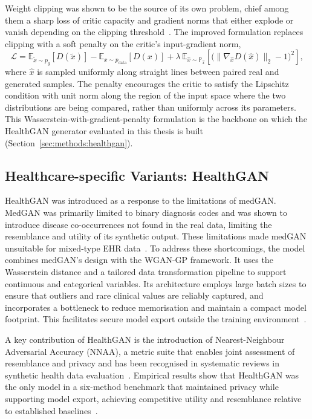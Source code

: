 Weight clipping was shown to be the source of
its own problem, chief among them a sharp loss of critic
capacity and gradient norms that either explode or vanish depending
on the clipping threshold~\cite{Gulrajani2017WGANGP}. The improved
formulation replaces clipping with a soft penalty on the critic's
input-gradient norm,
\begin{equation}
\label{eq:wgan-gp}
\mathcal{L}
= \mathbb{E}_{\tilde{x} \sim p_g}\!\left[D(\tilde{x})\right]
- \mathbb{E}_{x \sim p_{\text{data}}}\!\left[D(x)\right]
+ \lambda \,
\mathbb{E}_{\hat{x} \sim \mathbb{P}_{\hat{x}}}\!\left[
\bigl(\|\nabla_{\hat{x}} D(\hat{x})\|_{2} - 1\bigr)^{2}
\right],
\end{equation}
where $\hat{x}$ is sampled uniformly along straight lines between
paired real and generated samples. The penalty encourages the
critic to satisfy the Lipschitz condition with unit norm along the
region of the input space where the two distributions are being
compared, rather than uniformly across its parameters. This
Wasserstein-with-gradient-penalty formulation is the backbone on
which the HealthGAN generator evaluated in this thesis is built
(Section~\ref{sec:methods:healthgan}).

\subsection{Healthcare-specific Variants: HealthGAN}
\label{sec:bg:gan:health}

HealthGAN was introduced as a response to the limitations of medGAN. 
MedGAN was primarily limited to binary diagnosis codes and was shown to
introduce disease co-occurrences not found in the real data, limiting
the resemblance and utility of its synthetic output. These limitations made medGAN
unsuitable for mixed-type EHR data~\cite{healthgan}.
To address
these shortcomings, the model combines medGAN's design with the WGAN-GP
framework. It uses the Wasserstein distance and a tailored data
transformation pipeline to support continuous and categorical variables. Its architecture
employs large batch sizes to ensure that outliers and rare clinical values are
reliably captured, and incorporates a bottleneck to reduce memorisation and
maintain a compact model footprint. This facilitates secure model export outside
the training environment~\cite{healthgan}.

A key contribution of HealthGAN is the introduction
of Nearest-Neighbour Adversarial Accuracy (NNAA), a metric suite that
enables joint assessment of resemblance and privacy and has been recognised in
systematic reviews in synthetic health data
evaluation~\cite{Murtaza2023}. Empirical results show that HealthGAN was the
only model in a six-method benchmark that maintained privacy while supporting
model export, achieving competitive utility and resemblance relative to
established baselines~\cite{healthgan}.

